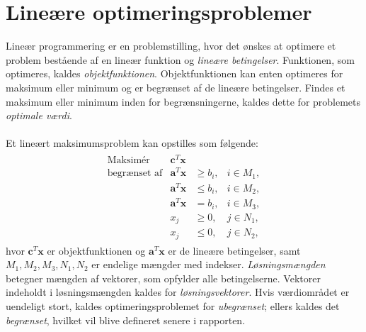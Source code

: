 \chapter{Lineære optimeringsproblemer}
%
Lineær programmering er en problemstilling, hvor det ønskes at optimere et problem bestående af en lineær funktion og \textit{lineære betingelser}.
Funktionen, som optimeres, kaldes \textit{objektfunktionen}.
Objektfunktionen kan enten optimeres for maksimum eller minimum og er begrænset af de lineære betingelser.
Findes et maksimum eller minimum inden for begrænsningerne, kaldes dette for problemets \textit{optimale værdi}.
\\\\
%
Et lineært maksimumsproblem kan opstilles som følgende:
%
\begin{align*}
\begin{array}{lrll}
\text{Maksimér}		&\textbf{c}^T\textbf{x}	&			&\\
\text{begrænset af}	&\textbf{a}^T\textbf{x}	&\geq b_i,	&i \in M_1,\\
					&\textbf{a}^T\textbf{x}	&\leq b_i,	&i \in M_2,\\
					&\textbf{a}^T\textbf{x}	& = b_i,	&i \in M_3,\\
					&x_j					&\geq 0,	&j \in N_1,\\
					&x_j					&\leq 0,	&j \in N_2,
\end{array}
\end{align*}
%
hvor $\textbf{c}^T\textbf{x}$ er objektfunktionen og $\textbf{a}^T\textbf{x}$ er de lineære betingelser, samt $M_1, M_2, M_3, N_1, N_2$ er endelige mængder med indekser.
\textit{Løsningsmængden} betegner mængden af vektorer, som opfylder alle betingelserne.
Vektorer indeholdt i løsningsmængden kaldes for \textit{løsningsvektorer}.
Hvis værdiområdet er uendeligt stort, kaldes optimeringsproblemet for \textit{ubegrænset}; ellers kaldes det \textit{begrænset}, hvilket vil blive defineret senere i rapporten. 
\\\\
%
